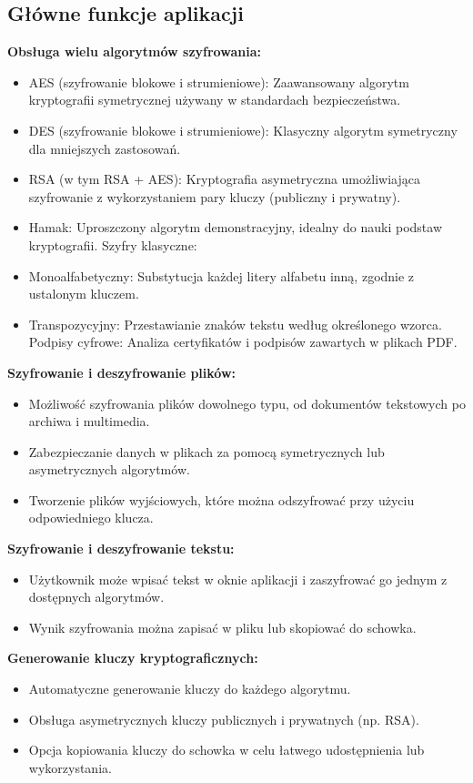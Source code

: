 \documentclass[12pt,a4paper]{article}
\begin{document}
\subsection{Główne funkcje aplikacji}
\textbf{Obsługa wielu algorytmów szyfrowania:}
\begin{itemize}
\item AES (szyfrowanie blokowe i strumieniowe): Zaawansowany algorytm kryptografii symetrycznej używany w standardach bezpieczeństwa.
\item DES (szyfrowanie blokowe i strumieniowe): Klasyczny algorytm symetryczny dla mniejszych zastosowań.
\item RSA (w tym RSA + AES): Kryptografia asymetryczna umożliwiająca szyfrowanie z wykorzystaniem pary kluczy (publiczny i prywatny).
\item Hamak: Uproszczony algorytm demonstracyjny, idealny do nauki podstaw kryptografii.
Szyfry klasyczne:
\item Monoalfabetyczny: Substytucja każdej litery alfabetu inną, zgodnie z ustalonym kluczem.
\item Transpozycyjny: Przestawianie znaków tekstu według określonego wzorca.
Podpisy cyfrowe: Analiza certyfikatów i podpisów zawartych w plikach PDF.
\end{itemize}

\textbf{Szyfrowanie i deszyfrowanie plików:}
\begin{itemize}
\item Możliwość szyfrowania plików dowolnego typu, od dokumentów tekstowych po archiwa i multimedia.
\item Zabezpieczanie danych w plikach za pomocą symetrycznych lub asymetrycznych algorytmów.
\item Tworzenie plików wyjściowych, które można odszyfrować przy użyciu odpowiedniego klucza.
\end{itemize}

\textbf{Szyfrowanie i deszyfrowanie tekstu:}
\begin{itemize}
\item Użytkownik może wpisać tekst w oknie aplikacji i zaszyfrować go jednym z dostępnych algorytmów.
\item Wynik szyfrowania można zapisać w pliku lub skopiować do schowka.
\end{itemize}

\textbf{Generowanie kluczy kryptograficznych:}
\begin{itemize}
\item Automatyczne generowanie kluczy do każdego algorytmu.
\item Obsługa asymetrycznych kluczy publicznych i prywatnych (np. RSA).
\item Opcja kopiowania kluczy do schowka w celu łatwego udostępnienia lub wykorzystania.
\end{itemize}
\end{document}
